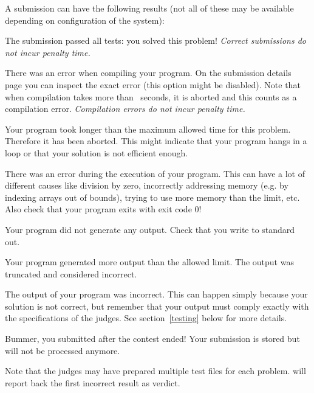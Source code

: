 A submission can have the following results (not all of these may be
available depending on configuration of the system):

\begin{description}[\setleftmargin{4.5cm}]
\item[CORRECT]
The submission passed all tests: you solved this problem!
\textit{Correct submissions do not incur penalty time.}

\item[COMPILER-ERROR]
There was an error when compiling your program. On the submission
details page you can inspect the exact error (this option might be
disabled).
Note that when compilation takes more than \COMPILETIME\ seconds, it is aborted and
this counts as a compilation error.
\textit{Compilation errors do not incur penalty time.}

\item[TIMELIMIT]
Your program took longer than the maximum allowed time for this
problem. Therefore it has been aborted. This might indicate that your
program hangs in a loop or that your solution is not efficient
enough.

\item[RUN-ERROR]
There was an error during the execution of your program. This can have
a lot of different causes like division by zero, incorrectly
addressing memory (e.g. by indexing arrays out of bounds), trying to
use more memory than the limit, etc.
Also check that your program exits with exit code 0!

\item[NO-OUTPUT]
Your program did not generate any output. Check that you write to
standard out.

\item[OUTPUT-LIMIT]
Your program generated more output than the allowed limit. The output
was truncated and considered incorrect.

\item[WRONG-ANSWER]
The output of your program was incorrect. This can happen simply
because your solution is not correct, but remember that your output
must comply exactly with the specifications of the judges. See
section~\ref{testing} below for more details.

\item[TOO-LATE]
Bummer, you submitted after the contest ended! Your submission is
stored but will not be processed anymore.
\end{description}

Note that the judges may have prepared multiple test files for each
problem. \DOMjudge will report back the first incorrect result as verdict.

